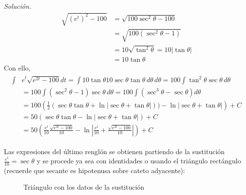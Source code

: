   \emph{Solución.} 
  \begin{align*}
    \sqrt{(e^{t})^{2}-100}&=\sqrt{100\sec ^{2}\theta-100 }\\
    &=\sqrt{100(\sec ^{2}\theta-1 )} \\
    &=10\sqrt{\tan ^{2}\theta }=10|\tan\theta | \\
    &=10\tan \theta
  \end{align*}
  Con ello,
  \begin{gather*}
    \begin{aligned}
      \int& e^{t} \sqrt{e^{2t}-100}dt
      =\int10\tan \theta10\sec\theta\tan\theta\,d\theta\,d\theta
      =100\int \tan^{2}\theta \sec \theta\,d\theta \\
      &=100\int (\sec^{2}\theta-1) \sec \theta\,d\theta
      =100\int (\sec^{3}\theta-\sec \theta) d\theta \\
    &=100\left(\frac{1}{2}(\sec\theta\tan\theta+\ln\vert\sec\theta+\tan\theta\vert))-\ln\vert\sec\theta+\tan\theta\vert\right) +C\\
    &=50(\sec\theta\tan\theta-\ln\vert\sec\theta+\tan\theta\vert)+C\\
    &=50\left (\frac{e^{t}}{10}\frac{\sqrt{e^{2t}-100}}{10}-\ln\left|\frac{e^{t}}{10}+\frac{\sqrt{e^{2t}-100}}{10}\right|\right) +C
  \end{aligned}
\end{gather*}

Las expresiones del último renglón se obtienen partiendo de la sustitución $\frac{e^{t}}{10}=\sec\theta$ y se procede ya sea con identidades o usando el triángulo rectángulo (recuerde que secante es hipotenusa sobre cateto adyacente):

\begin{figure}[H]
  \centering
  \caption{Triángulo con los datos de la sustitución}
  \propia
\end{figure}

